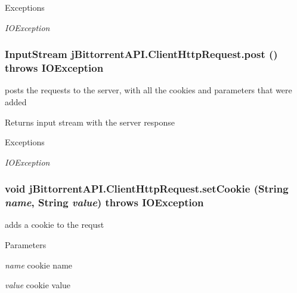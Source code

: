 \begin{DoxyExceptions}{Exceptions}
\item[{\em IOException}]\end{DoxyExceptions}
\hypertarget{classj_bittorrent_a_p_i_1_1_client_http_request_ae02b325689257902738d3f0a632ba430}{
\subsubsection[{post}]{\setlength{\rightskip}{0pt plus 5cm}InputStream jBittorrentAPI.ClientHttpRequest.post ()  throws IOException }}
\label{classj_bittorrent_a_p_i_1_1_client_http_request_ae02b325689257902738d3f0a632ba430}
posts the requests to the server, with all the cookies and parameters that were added \begin{DoxyReturn}{Returns}
input stream with the server response 
\end{DoxyReturn}

\begin{DoxyExceptions}{Exceptions}
\item[{\em IOException}]\end{DoxyExceptions}
\hypertarget{classj_bittorrent_a_p_i_1_1_client_http_request_a958b7488fc0786851eb4376aed17782b}{
\subsubsection[{setCookie}]{\setlength{\rightskip}{0pt plus 5cm}void jBittorrentAPI.ClientHttpRequest.setCookie (String {\em name}, \/  String {\em value})  throws IOException }}
\label{classj_bittorrent_a_p_i_1_1_client_http_request_a958b7488fc0786851eb4376aed17782b}
adds a cookie to the requst 
\begin{DoxyParams}{Parameters}
\item[{\em name}]cookie name \item[{\em value}]cookie value \end{DoxyParams}

